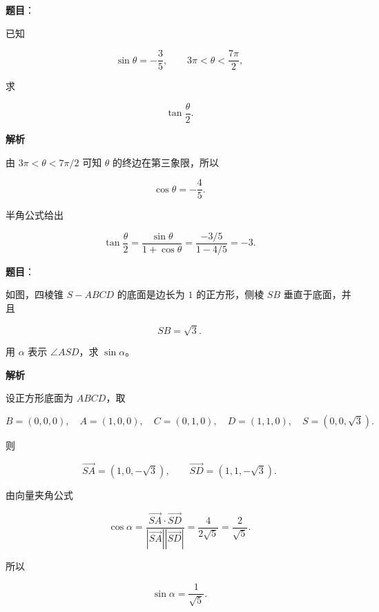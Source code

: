 \begin{answer}

\textbf{题目}：

已知

\nopagebreak[4]
\[
\sin\theta=-\frac35,\qquad
3\pi<\theta<\frac{7\pi}{2},
\]

求

\nopagebreak[4]
\[
\tan\frac\theta2.
\]

\textbf{解析}

由 $3\pi<\theta<7\pi/2$ 可知 $\theta$ 的终边在第三象限，所以

\nopagebreak[4]
\[
\cos\theta=-\frac45.
\]

半角公式给出

\nopagebreak[4]
\[
\tan\frac\theta2
=\frac{\sin\theta}{1+\cos\theta}
=\frac{-3/5}{1-4/5}=-3.
\]


\end{answer}
\begin{answer}

\textbf{题目}：

如图，四棱锥 $S-ABCD$ 的底面是边长为 $1$ 的正方形，侧棱 $SB$ 垂直于底面，并且

\nopagebreak[4]
\[
SB=\sqrt3.
\]

用 $\alpha$ 表示 $\angle ASD$，求 $\sin\alpha$。
\nopagebreak[4]
\begin{center}\end{center}
\nopagebreak[4]
\textbf{解析}

设正方形底面为 $ABCD$，取

\nopagebreak[4]
\[
B=(0,0,0),\quad A=(1,0,0),\quad
C=(0,1,0),\quad D=(1,1,0),\quad
S=(0,0,\sqrt3).
\]

则

\nopagebreak[4]
\[
\overrightarrow{SA}=(1,0,-\sqrt3),
\qquad
\overrightarrow{SD}=(1,1,-\sqrt3).
\]

由向量夹角公式

\nopagebreak[4]
\[
\cos\alpha
=\frac{\overrightarrow{SA}\cdot\overrightarrow{SD}}
{|\overrightarrow{SA}||\overrightarrow{SD}|}
=\frac4{2\sqrt5}=\frac2{\sqrt5}.
\]

所以

\nopagebreak[4]
\[
\sin\alpha=\frac1{\sqrt5}.
\]


\end{answer}
